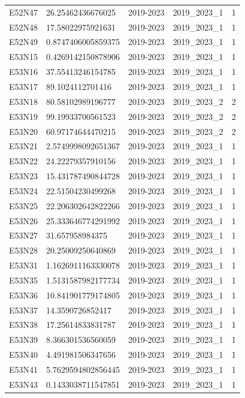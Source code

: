 \begin{landscape}
\begin{longtable}{lllll}
E52N47 & 26.25462436676025 & 2019-2023 & 2019\_2023\_1 & 1 \\
E52N48 & 17.58022975921631 & 2019-2023 & 2019\_2023\_1 & 1 \\
E52N49 & 0.8747406005859375 & 2019-2023 & 2019\_2023\_1 & 1 \\
E53N15 & 0.4269142150878906 & 2019-2023 & 2019\_2023\_1 & 1 \\
E53N16 & 37.55413246154785 & 2019-2023 & 2019\_2023\_1 & 1 \\
E53N17 & 89.1024112701416 & 2019-2023 & 2019\_2023\_1 & 1 \\
E53N18 & 80.58102989196777 & 2019-2023 & 2019\_2023\_2 & 2 \\
E53N19 & 99.19933700561523 & 2019-2023 & 2019\_2023\_2 & 2 \\
E53N20 & 60.97174644470215 & 2019-2023 & 2019\_2023\_2 & 2 \\
E53N21 & 2.5749998092651367 & 2019-2023 & 2019\_2023\_1 & 1 \\
E53N22 & 24.22279357910156 & 2019-2023 & 2019\_2023\_1 & 1 \\
E53N23 & 15.431787490844728 & 2019-2023 & 2019\_2023\_1 & 1 \\
E53N24 & 22.51504230499268 & 2019-2023 & 2019\_2023\_1 & 1 \\
E53N25 & 22.206302642822266 & 2019-2023 & 2019\_2023\_1 & 1 \\
E53N26 & 25.333646774291992 & 2019-2023 & 2019\_2023\_1 & 1 \\
E53N27 & 31.657958984375 & 2019-2023 & 2019\_2023\_1 & 1 \\
E53N28 & 20.25009250640869 & 2019-2023 & 2019\_2023\_1 & 1 \\
E53N31 & 1.1626911163330078 & 2019-2023 & 2019\_2023\_1 & 1 \\
E53N35 & 1.5131587982177734 & 2019-2023 & 2019\_2023\_1 & 1 \\
E53N36 & 10.841901779174805 & 2019-2023 & 2019\_2023\_1 & 1 \\
E53N37 & 14.3590726852417 & 2019-2023 & 2019\_2023\_1 & 1 \\
E53N38 & 17.25614833831787 & 2019-2023 & 2019\_2023\_1 & 1 \\
E53N39 & 8.366301536560059 & 2019-2023 & 2019\_2023\_1 & 1 \\
E53N40 & 4.491981506347656 & 2019-2023 & 2019\_2023\_1 & 1 \\
E53N41 & 5.7629594802856445 & 2019-2023 & 2019\_2023\_1 & 1 \\
E53N43 & 0.1433038711547851 & 2019-2023 & 2019\_2023\_1 & 1 \\

\end{longtable}
\end{landscape}
